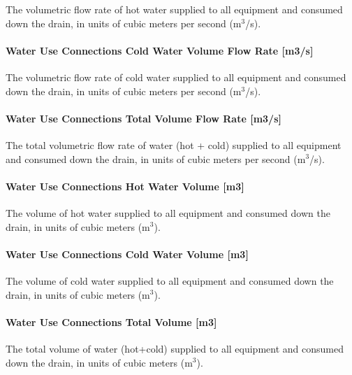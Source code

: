 The volumetric flow rate of hot water supplied to all equipment and consumed down the drain, in units of cubic meters per second (m\(^{3}\)/s).

\paragraph{Water Use Connections Cold Water Volume Flow Rate {[}m3/s{]}}\label{water-use-connections-cold-water-volume-flow-rate-m3s}

The volumetric flow rate of cold water supplied to all equipment and consumed down the drain, in units of cubic meters per second (m\(^{3}\)/s).

\paragraph{Water Use Connections Total Volume Flow Rate {[}m3/s{]}}\label{water-use-connections-total-volume-flow-rate-m3s}

The total volumetric flow rate of water (hot + cold) supplied to all equipment and consumed down the drain, in units of cubic meters per second (m\(^{3}\)/s).

\paragraph{Water Use Connections Hot Water Volume {[}m3{]}}\label{water-use-connections-hot-water-volume-m3}

The volume of hot water supplied to all equipment and consumed down the drain, in units of cubic meters (m\(^{3}\)).

\paragraph{Water Use Connections Cold Water Volume {[}m3{]}}\label{water-use-connections-cold-water-volume-m3}

The volume of cold water supplied to all equipment and consumed down the drain, in units of cubic meters (m\(^{3}\)).

\paragraph{Water Use Connections Total Volume {[}m3{]}}\label{water-use-connections-total-volume-m3}

The total volume of water (hot+cold) supplied to all equipment and consumed down the drain, in units of cubic meters (m\(^{3}\)).

